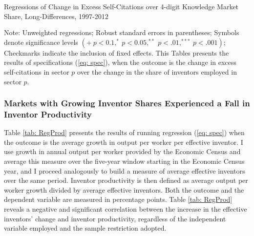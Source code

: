 \begin{table}
\caption{Regressions of Change in Excess Self-Citations over 4-digit Knowledge
Market Share, Long-Differences, 1997-2012\label{tab: RegSelfCite}}

\begin{centering}
\scalebox{.9}{}
\par\end{centering}
\begin{centering}
\par\end{centering}
\raggedright{}{\small{}Note: Unweighted regressions; Robust standard
errors in parentheses; Symbols denote significance levels $\left(+\ p<0.1,^{*}\ p<0.05,^{**}\ p<.01,^{***}\ p<.001\right)$;
Checkmarks indicate the inclusion of fixed effects. This Tables presents
the results of specifications (\ref{eq: spec}), when the outcome
is the change in excess self-citations in sector $p$ over the change
in the share of inventors employed in sector $p$. }{\small\par}
\end{table}
\FloatBarrier

\subsubsection{Markets with Growing Inventor Shares Experienced a Fall in Inventor
Productivity}

Table \ref{tab: RegProd} presents the results of running regression
(\ref{eq: spec}) when the outcome is the average growth in output
per worker per effective inventor. I use growth in annual output per
worker provided by the Economic Census and average this measure over
the five-year window starting in the Economic Census year, and I proceed
analogously to build a measure of average effective inventors over
the same period. Inventor productivity is then defined as average
output per worker growth divided by average effective inventors. Both
the outcome and the dependent variable are measured in percentage
points. Table \ref{tab: RegProd} reveals a negative and significant
correlation between the increase in the effective inventors' change
and inventor productivity, regardless of the independent variable
employed and the sample restriction adopted.

